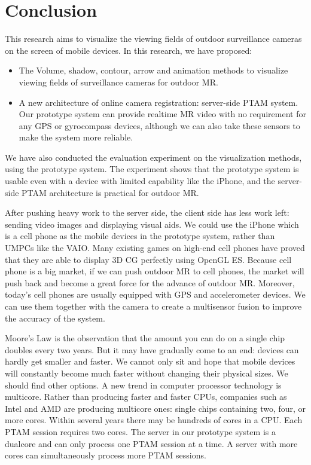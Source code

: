 \chapter{Conclusion}
\label{Chapter5}

This research aims to visualize the viewing fields of outdoor surveillance cameras on the screen of mobile devices. In this research, we have proposed:

\begin{itemize}
	\item The Volume, shadow, contour, arrow and animation methods to visualize viewing fields of surveillance cameras for outdoor MR.
	\item A new architecture of online camera registration: server-side PTAM \cite{Reference12} system. Our prototype system can provide realtime MR video with no requirement for any GPS or gyrocompass devices, although we can also take these sensors to make the system more reliable.
\end{itemize}

We have also conducted the evaluation experiment on the visualization methods, using the prototype system. The experiment shows that the prototype system is usable even with a device with limited capability like the iPhone, and the server-side PTAM architecture is practical for outdoor MR.

After pushing heavy work to the server side, the client side has less work left: sending video images and displaying visual aids. We could use the iPhone which is a cell phone as the mobile devices in the prototype system, rather than UMPCs like the VAIO. Many existing games on high-end cell phones have proved that they are able to display 3D CG perfectly using OpenGL ES. Because cell phone is a big market, if we can push outdoor MR to cell phones, the market will push back and become a great force for the advance of outdoor MR. Moreover, today's cell phones are usually equipped with GPS and accelerometer devices. We can use them together with the camera to create a multisensor fusion \cite{Reference14} to improve the accuracy of the system.

Moore's Law is the observation that the amount you can do on a single chip doubles every two years. But it may have gradually come to an end: devices can hardly get smaller and faster. We cannot only sit and hope that mobile devices will constantly become much faster without changing their physical sizes. We should find other options. A new trend in computer processor technology is multicore. Rather than producing faster and faster CPUs, companies such as Intel and AMD are producing multicore ones: single chips containing two, four, or more cores. Within several years there may be hundreds of cores in a CPU. Each PTAM session requires two cores. The server in our prototype system is a dualcore and can only process one PTAM session at a time. A server with more cores can simultaneously process more PTAM sessions.

